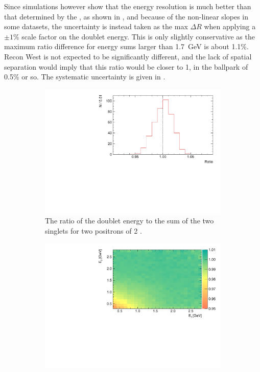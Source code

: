 Since simulations however show that the energy resolution is much better than that determined by the \chisq, as shown in , and because of the non-linear slopes in some datasets, the uncertainty is instead taken as the max $\Delta R$ when applying a $\pm1\%$ scale factor on the doublet energy. This is only slightly conservative as the maximum ratio difference for energy sums larger than \SI{1.7}{\GeV} is about 1.1\%. Recon West is not expected to be significantly different, and the lack of spatial separation would imply that this ratio would be closer to 1, in the ballpark of 0.5\% or so. The systematic uncertainty is given in .


\begin{figure}[h]
\centering
    \begin{subfigure}[t]{0.45\textwidth}
        \centering
        \includegraphics[width=\textwidth]{p_ratio_2_2_hist}
        \caption{The ratio of the doublet energy to the sum of the two singlets for two positrons of 2 \GeV.}
    \end{subfigure}%
    \hspace{1cm}
    \begin{subfigure}[t]{0.45\textwidth}
        \centering
        \includegraphics[width=\textwidth]{p_ratio_e1_e2}

\end{subfigure}
\end{figure}
